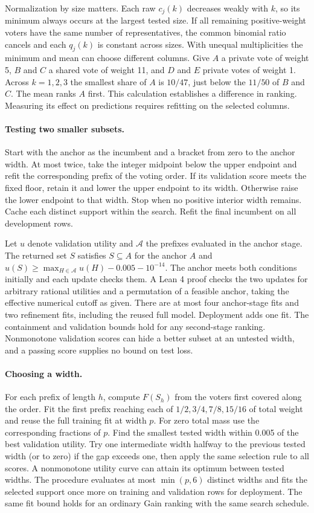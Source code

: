 Normalization by size matters. Each raw $c_j(k)$ decreases weakly with $k$, so its minimum always occurs at the largest tested size. If all remaining positive-weight voters have the same number of representatives, the common binomial ratio cancels and each $q_j(k)$ is constant across sizes. With unequal multiplicities the minimum and mean can choose different columns. Give $A$ a private vote of weight 5, $B$ and $C$ a shared vote of weight 11, and $D$ and $E$ private votes of weight 1. Across $k=1,2,3$ the smallest share of $A$ is $10/47$, just below the $11/50$ of $B$ and $C$. The mean ranks $A$ first. This calculation establishes a difference in ranking. Measuring its effect on predictions requires refitting on the selected columns.

\ifdefined\anchoredMinPI
\paragraph{Testing two smaller subsets.}
Start with the anchor as the incumbent and a bracket from zero to the anchor width. At most twice, take the integer midpoint below the upper endpoint and refit the corresponding prefix of the voting order. If its validation score meets the fixed floor, retain it and lower the upper endpoint to its width. Otherwise raise the lower endpoint to that width. Stop when no positive interior width remains. Cache each distinct support within the search. Refit the final incumbent on all development rows.

Let $u$ denote validation utility and $\mathcal A$ the prefixes evaluated in the anchor stage. The returned set $S$ satisfies $S\subseteq A$ for the anchor $A$ and $u(S)\ge\max_{H\in\mathcal A}u(H)-0.005-10^{-14}$. The anchor meets both conditions initially and each update checks them. A Lean 4 proof checks the two updates for arbitrary rational utilities and a permutation of a feasible anchor, taking the effective numerical cutoff as given. There are at most four anchor-stage fits and two refinement fits, including the reused full model. Deployment adds one fit. The containment and validation bounds hold for any second-stage ranking. Nonmonotone validation scores can hide a better subset at an untested width, and a passing score supplies no bound on test loss.
\else
\paragraph{Choosing a width.}
For each prefix of length $h$, compute $F(S_h)$ from the voters first covered along the order. Fit the first prefix reaching each of $1/2,3/4,7/8,15/16$ of total weight and reuse the full training fit at width $p$. For zero total mass use the corresponding fractions of $p$. Find the smallest tested width within 0.005 of the best validation utility. Try one intermediate width halfway to the previous tested width (or to zero) if the gap exceeds one, then apply the same selection rule to all scores. A nonmonotone utility curve can attain its optimum between tested widths. The procedure evaluates at most $\min(p,6)$ distinct widths and fits the selected support once more on training and validation rows for deployment. The same fit bound holds for an ordinary Gain ranking with the same search schedule.
\fi
